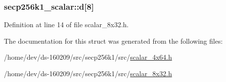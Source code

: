 \subsubsection[{d}]{ secp256k1\+\_\+scalar\+::d\mbox{[}8\mbox{]}}\label{structsecp256k1__scalar_a59f64975b56084412306eb10aaa6d54e}


Definition at line 14 of file scalar\+\_\+8x32.\+h.



The documentation for this struct was generated from the following files\+:\begin{DoxyCompactItemize}
\item 
/home/dev/ds-\/160209/src/secp256k1/src/\hyperlink{scalar__4x64_8h}{scalar\+\_\+4x64.\+h}\item 
/home/dev/ds-\/160209/src/secp256k1/src/\hyperlink{scalar__8x32_8h}{scalar\+\_\+8x32.\+h}\end{DoxyCompactItemize}
